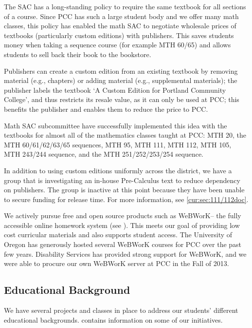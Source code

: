 The SAC has a long-standing policy to require the same textbook for all sections of a course. Since PCC has such a large student body and we offer many math classes, this policy has enabled the math SAC to negotiate wholesale prices of textbooks (particularly custom editions) with publishers.  This saves students money when taking a sequence course (for example MTH 60/65) and allows students to sell back their book to the bookstore.

Publishers can create a custom edition from an existing textbook by removing material (e.g., chapters) or adding material (e.g., supplemental materials); the publisher labels the textbook `A Custom Edition for Portland Community College', and thus restricts its resale value, as it can only be used at PCC; this benefits the publisher and enables them to reduce the price to PCC.  

Math SAC subcommittee have successfully implemented this idea with the textbooks for almost all of the mathematics classes taught at PCC: MTH 20, the MTH 60/61/62/63/65 sequences, MTH 95, MTH 111, MTH 112, MTH 105, MTH 243/244 sequence, and the MTH 251/252/253/254 sequence.

In addition to using custom editions uniformly across the district, we have a group that is investigating an in-house Pre-Calculus text to reduce dependency on publishers. The group is inactive at this point because they have been unable to secure funding for release time. For more information, see \cref{cur:sec:111/112doc}.

We actively pursue free and open source products such as WeBWorK-- the fully accessible online homework system (see ). This meets our goal of providing low cost curricular materials and also supports student access. The University of Oregon has generously hosted several WeBWorK courses for PCC over the past few years.  Disability Services has provided strong support for WeBWorK, and we were able to procure our own WeBWorK server at PCC in the Fall of 2013.

\subsection{Educational Background}
We have several projects and classes in place to address our students' different educational backgrounds.  contains information on some of our initiatives.


